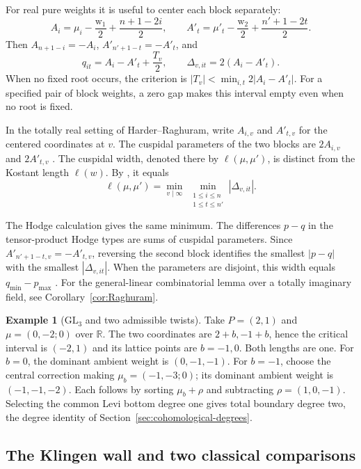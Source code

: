 \documentclass[12pt]{amsart}
\numberwithin{equation}{section}
\theoremstyle{plain}
\theoremstyle{definition}
\newtheorem{example}[theorem]{Example}
\theoremstyle{remark}
\newcommand{\R}{\mathbb R}
\newcommand{\GL}{\mathrm{GL}}
\begin{document}
For real pure weights it is useful to center each block separately:
\[
 A_i=\mu_i-\frac{\mathrm{w}_1}{2}+\frac{n+1-2i}{2},\qquad
 A'_t=\mu'_t-\frac{\mathrm{w}_2}{2}+\frac{n'+1-2t}{2}.
\]
Then $A_{n+1-i}=-A_i$, $A'_{n'+1-t}=-A'_t$, and 
\[
 q_{it}=A_i-A'_t+\frac{T_v}{2},\qquad
 \Delta_{v,it}=2(A_i-A'_t).
\]
When no fixed root occurs, the criterion is $|T_v|<\min_{i,t}2|A_i-A'_t|$. For a specified pair of block weights, a zero gap makes this interval empty even when no root is fixed.

In the totally real setting of Harder--Raghuram, write $A_{i,v}$ and $A'_{t,v}$ for the centered coordinates at $v$. The cuspidal parameters of the two blocks are $2A_{i,v}$ and $2A'_{t,v}$ \cite[\S7.4.1]{HarderRaghuram2020}. The cuspidal width, denoted there by $\ell(\mu,\mu')$, is distinct from the Kostant length $\ell(w)$. By \cite[Def.~7.4]{HarderRaghuram2020}, it equals
\[
  \ell(\mu,\mu')
    =\min_{v\mid\infty}\ \min_{\substack{1\le i\le n\\1\le t\le n'}}
        |\Delta_{v,it}|.
\]

The Hodge calculation gives the same minimum. The differences $p-q$ in the tensor-product Hodge types are sums of cuspidal parameters. Since $A'_{n'+1-t,v}=-A'_{t,v}$, reversing the second block identifies the smallest $|p-q|$ with the smallest $|\Delta_{v,it}|$. When the parameters are disjoint, this width equals $q_{\min}-p_{\max}$ \cite[\S\S7.1.3 and~7.2.2.1]{HarderRaghuram2020}. For the general-linear combinatorial lemma over a totally imaginary field, see Corollary~\ref{cor:Raghuram}.

\begin{example}[$\GL_3$ and two admissible twists]
Take $P=(2,1)$ and $\mu=(0,-2;0)$ over $\R$. The two coordinates are $2+b,-1+b$, hence the critical interval is $(-2,1)$ and its lattice points are $b=-1,0$. Both lengths are one. For $b=0$, the dominant ambient weight is $(0,-1,-1)$. For $b=-1$, choose the central correction making $\mu_b=(-1,-3;0)$; its dominant ambient weight is $(-1,-1,-2)$. Each follows by sorting $\mu_b+\rho$ and subtracting $\rho=(1,0,-1)$. Selecting the common Levi bottom degree one gives total boundary degree two, the degree identity of Section~\ref{sec:cohomological-degrees}. 
\end{example}

\subsection{The Klingen wall and two classical comparisons}\label{subsec:classical-tests}
\end{document}
